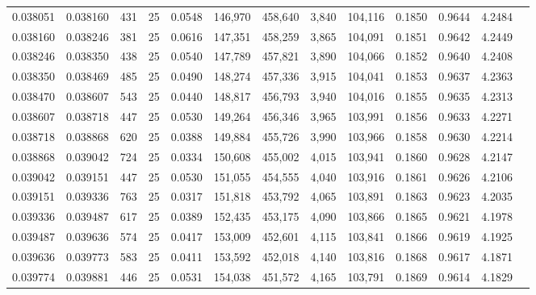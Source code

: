 \begin{tabular}{rrrrrrrrrrrrr}
0.038051 & 0.038160 &   431 &  25 &                                     0.0548 & 146,970 & 458,640 &   3,840 & 104,116 & 0.1850 & 0.9644 & 4.2484 \\
0.038160 & 0.038246 &   381 &  25 &                                     0.0616 & 147,351 & 458,259 &   3,865 & 104,091 & 0.1851 & 0.9642 & 4.2449 \\
0.038246 & 0.038350 &   438 &  25 &                                     0.0540 & 147,789 & 457,821 &   3,890 & 104,066 & 0.1852 & 0.9640 & 4.2408 \\
0.038350 & 0.038469 &   485 &  25 &                                     0.0490 & 148,274 & 457,336 &   3,915 & 104,041 & 0.1853 & 0.9637 & 4.2363 \\
0.038470 & 0.038607 &   543 &  25 &                                     0.0440 & 148,817 & 456,793 &   3,940 & 104,016 & 0.1855 & 0.9635 & 4.2313 \\
0.038607 & 0.038718 &   447 &  25 &                                     0.0530 & 149,264 & 456,346 &   3,965 & 103,991 & 0.1856 & 0.9633 & 4.2271 \\
0.038718 & 0.038868 &   620 &  25 &                                     0.0388 & 149,884 & 455,726 &   3,990 & 103,966 & 0.1858 & 0.9630 & 4.2214 \\
0.038868 & 0.039042 &   724 &  25 &                                     0.0334 & 150,608 & 455,002 &   4,015 & 103,941 & 0.1860 & 0.9628 & 4.2147 \\
0.039042 & 0.039151 &   447 &  25 &                                     0.0530 & 151,055 & 454,555 &   4,040 & 103,916 & 0.1861 & 0.9626 & 4.2106 \\
0.039151 & 0.039336 &   763 &  25 &                                     0.0317 & 151,818 & 453,792 &   4,065 & 103,891 & 0.1863 & 0.9623 & 4.2035 \\
0.039336 & 0.039487 &   617 &  25 &                                     0.0389 & 152,435 & 453,175 &   4,090 & 103,866 & 0.1865 & 0.9621 & 4.1978 \\
0.039487 & 0.039636 &   574 &  25 &                                     0.0417 & 153,009 & 452,601 &   4,115 & 103,841 & 0.1866 & 0.9619 & 4.1925 \\
0.039636 & 0.039773 &   583 &  25 &                                     0.0411 & 153,592 & 452,018 &   4,140 & 103,816 & 0.1868 & 0.9617 & 4.1871 \\
0.039774 & 0.039881 &   446 &  25 &                                     0.0531 & 154,038 & 451,572 &   4,165 & 103,791 & 0.1869 & 0.9614 & 4.1829 \\

\end{tabular}
